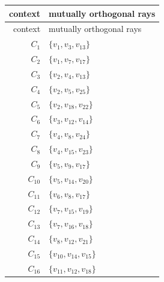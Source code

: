 \begin{longtable}{@{}r l@{}}
\toprule
context & mutually orthogonal rays\\
\midrule
\endfirsthead
\toprule
context & mutually orthogonal rays\\
\midrule
\endhead
$C_{1}$ & $\{v_{1},v_{3},v_{13}\}$\\
$C_{2}$ & $\{v_{1},v_{7},v_{17}\}$\\
$C_{3}$ & $\{v_{2},v_{4},v_{13}\}$\\
$C_{4}$ & $\{v_{2},v_{5},v_{25}\}$\\
$C_{5}$ & $\{v_{2},v_{18},v_{22}\}$\\
$C_{6}$ & $\{v_{3},v_{12},v_{14}\}$\\
$C_{7}$ & $\{v_{4},v_{8},v_{24}\}$\\
$C_{8}$ & $\{v_{4},v_{15},v_{23}\}$\\
$C_{9}$ & $\{v_{5},v_{9},v_{17}\}$\\
$C_{10}$ & $\{v_{5},v_{14},v_{20}\}$\\
$C_{11}$ & $\{v_{6},v_{8},v_{17}\}$\\
$C_{12}$ & $\{v_{7},v_{15},v_{19}\}$\\
$C_{13}$ & $\{v_{7},v_{16},v_{18}\}$\\
$C_{14}$ & $\{v_{8},v_{12},v_{21}\}$\\
$C_{15}$ & $\{v_{10},v_{14},v_{15}\}$\\
$C_{16}$ & $\{v_{11},v_{12},v_{18}\}$\\
\bottomrule
\end{longtable}
